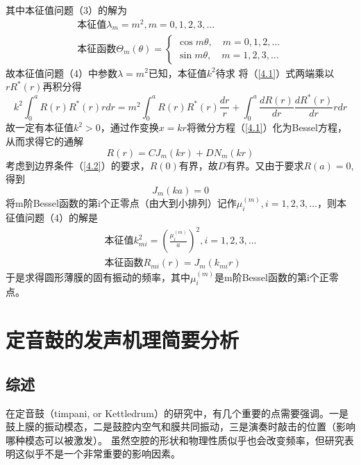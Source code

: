 其中本征值问题（3）的解为
\[
\begin{array}{c}
\text{本征值}\lambda_m=m^2, m=0,1,2,3,\ldots\\
\text{本征函数}\Theta_m(\theta)=\left\{\begin{array}{l}\cos m \theta, \quad m=0,1,2, \ldots \\ \sin m \theta, \quad m=1,2,3, \ldots\end{array}\right.
\end{array}
\]
故本征值问题（4）中参数$\lambda=m^2$已知，本征值$k^2$待求
将（\ref{4.1}）式两端乘以$rR^*(r)$再积分得$$k^2 \int_0^a R(r) R^*(r) r d r=m^2 \int_0^a R(r) R^*(r) \frac{d r}{r}+\int_0^a \frac{d R(r)}{d r} \frac{d R^*(r)}{d r} r d r$$
故一定有本征值$k^2>0$，通过作变换$x=kr$将微分方程（\ref{4.1}）化为Bessel方程，从而求得它的通解$$R(r)=C J_m(k r)+D N_m(k r)$$
考虑到边界条件（\ref{4.2}）的要求，$R(0)$有界，故$D$有界。又由于要求$R(a)=0$,得到$$J_m(ka)=0$$
将m阶Bessel函数的第i个正零点（由大到小排列）记作$\mu^{(m)}_i,i=1,2,3,\ldots$，则本征值问题（4）的解是
\[
\begin{array}{c}
\text{本征值}k_{mi}^2=(\frac{\mu^{(m)}_i}a)^2, i=1,2,3,\ldots\\
\text{本征函数}R_{mi}(r)=J_m(k_{mi}r)
\end{array}
\]
于是求得圆形薄膜的固有振动的频率，其中$\mu^{(m)}_i$是m阶Bessel函数的第i个正零点。

\section{定音鼓的发声机理简要分析}

\subsection{综述}
在定音鼓（timpani, or Kettledrum）的研究中，有几个重要的点需要强调。一是鼓上膜的振动模态，二是鼓腔内空气和膜共同振动，三是演奏时敲击的位置（影响哪种模态可以被激发）。
虽然空腔的形状和物理性质似乎也会改变频率，但研究表明这似乎不是一个非常重要的影响因素。
